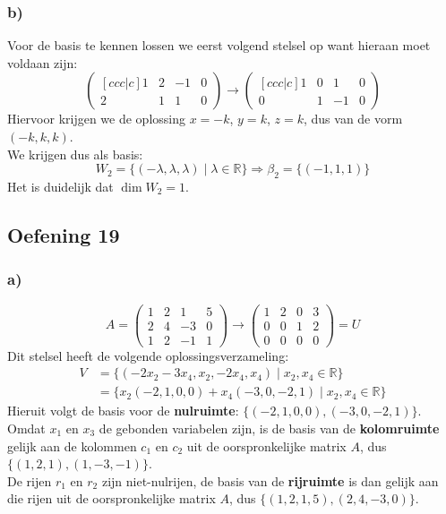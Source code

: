 \documentclass[lineaire_algebra_oplossingen.tex]{subfiles}
\begin{document}
\subsubsection*{b)}
Voor de basis te kennen lossen we eerst volgend stelsel op want hieraan moet voldaan zijn:
\[
\begin{pmatrix}[ccc|c]
1 & 2 & -1 & 0 \\
2 & 1 &  1 & 0
\end{pmatrix}
\longrightarrow
\begin{pmatrix}[ccc|c]
1 & 0 &  1 & 0 \\
0 & 1 & -1 & 0
\end{pmatrix}
\]
Hiervoor krijgen we de oplossing $x=-k$, $y= k$, $z=k$, dus van de vorm $(-k,k,k)$.\\
We krijgen dus als basis:
\[
W_2 = \{(-\lambda, \lambda, \lambda)\mid\lambda \in \mathbb{R}\}
\Longrightarrow
\beta_2 = \{ (-1,1,1) \}
\]
Het is duidelijk dat $\dim W_2 = 1$.

\subsection{Oefening 19}
\subsubsection*{a)}
\[
A =
\begin{pmatrix}
1 & 2 &  1 & 5 \\
2 & 4 & -3 & 0 \\
1 & 2 & -1 & 1
\end{pmatrix}
\longrightarrow
\begin{pmatrix}
1 & 2 & 0 & 3 \\
0 & 0 & 1 & 2 \\
0 & 0 & 0 & 0
\end{pmatrix}
= U
\]
Dit stelsel heeft de volgende oplossingsverzameling:
\begin{align*}
V
&= \{ (-2x_2-3x_4,x_2,-2x_4,x_4) \mid x_2,x_4 \in \mathbb{R} \} \\
&= \{ x_2(-2,1,0,0) + x_4(-3,0,-2,1) \mid x_2,x_4 \in \mathbb{R} \}
\end{align*}
Hieruit volgt de basis voor de \textbf{nulruimte}: $\{ (-2,1,0,0), (-3,0,-2,1) \}$.\\
Omdat $x_1$ en $x_3$ de gebonden variabelen zijn, is de basis van de \textbf{kolomruimte} gelijk aan de kolommen $c_1$ en $c_2$ uit de oorspronkelijke matrix $A$, dus $\{(1,2,1),(1,-3,-1)\}$.\\
De rijen $r_1$ en $r_2$ zijn niet-nulrijen, de basis van de \textbf{rijruimte} is dan gelijk aan die rijen uit de oorspronkelijke matrix $A$, dus $\{(1,2,1,5),(2,4,-3,0)\}$.
\end{document}

